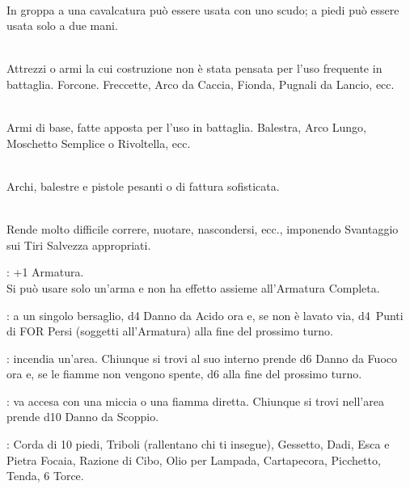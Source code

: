 \documentclass[itdr]{subfiles}
\begin{document}
\\In groppa a una cavalcatura può essere usata con uno scudo; a piedi può essere usata solo a due mani.
\vfill


\\Attrezzi o armi la cui costruzione non è stata pensata per l’uso frequente in battaglia. Forcone. Freccette, Arco da Caccia, Fionda, Pugnali da Lancio, ecc.

\\Armi di base, fatte apposta per l’uso in battaglia. \mbox{Balestra,} Arco Lungo, Moschetto Semplice o Rivoltella, ecc.

\\Archi, balestre e pistole pesanti o di fattura sofisticata. 

\vfill



\\Rende molto difficile correre, nuotare, nascondersi, ecc., imponendo Svantaggio sui Tiri Salvezza appropriati.

: +1 Armatura.\\Si può usare solo un'arma e non ha effetto assieme all’Armatura Completa.

\break


: a un singolo bersaglio, d4 Danno da Acido ora e, se non è lavato via, d4~Punti di FOR Persi (soggetti all'Armatura) alla fine del prossimo turno.

: incendia un'area. Chiunque si trovi al suo interno prende d6 Danno da Fuoco ora e, se le fiamme non vengono spente, d6 alla fine del prossimo turno.

: va accesa con una miccia o una fiamma diretta. Chiunque si trovi nell'area prende d10 Danno da Scoppio.

: Corda di 10 piedi, Triboli (rallentano chi ti insegue), Gessetto, Dadi, Esca e Pietra Focaia, Razione di Cibo, Olio per Lampada, Cartapecora, Picchetto, Tenda, 6 Torce.
\end{document}
